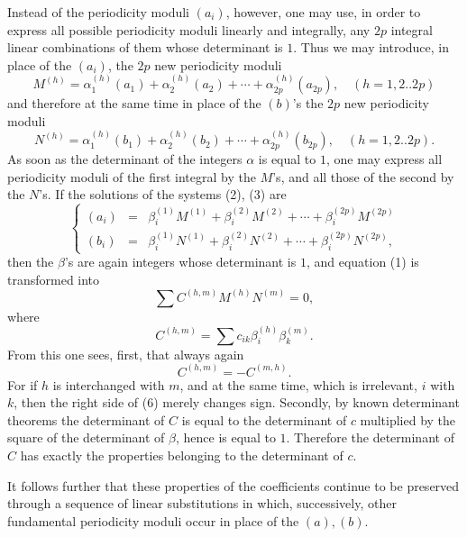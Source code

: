 \documentclass[10pt]{article}
\begin{document}
Instead of the periodicity moduli \((a_i)\), however, one may use, in order to express all possible periodicity moduli linearly and integrally, any \(2p\) integral linear combinations of them whose determinant is \(1\). Thus we may introduce, in place of the \((a_i)\), the \(2p\) new periodicity moduli
\[
\tag{2}M^{(h)}=\alpha_1^{(h)}(a_1)+\alpha_2^{(h)}(a_2)+\cdots+\alpha_{2p}^{(h)}(a_{2p}),\quad(h=1,2..2p)
\]
and therefore at the same time in place of the \((b)\)'s the \(2p\) new periodicity moduli
\[
\tag{3}N^{(h)}=\alpha_1^{(h)}(b_1)+\alpha_2^{(h)}(b_2)+\cdots+\alpha_{2p}^{(h)}(b_{2p}),\quad(h=1,2..2p).
\]
As soon as the determinant of the integers \(\alpha\) is equal to \(1\), one may express all periodicity moduli of the first integral by the \(M\)'s, and all those of the second by the \(N\)'s. If the solutions of the systems (2), (3) are
\[
\tag{4}
\left\{\begin{array}{rcl}
(a_i)&=&\beta_i^{(1)}M^{(1)}+\beta_i^{(2)}M^{(2)}+\cdots+\beta_i^{(2p)}M^{(2p)}\\
(b_i)&=&\beta_i^{(1)}N^{(1)}+\beta_i^{(2)}N^{(2)}+\cdots+\beta_i^{(2p)}N^{(2p)},
\end{array}\right.
\]
then the \(\beta\)'s are again integers whose determinant is \(1\), and equation (1) is transformed into
\[
\tag{5}\sum C^{(h,m)}M^{(h)}N^{(m)}=0,
\]
where
\[
\tag{6}C^{(h,m)}=\sum c_{ik}\beta_i^{(h)}\beta_k^{(m)}.
\]
From this one sees, first, that always again
\[
C^{(h,m)}=-C^{(m,h)}.
\]
For if \(h\) is interchanged with \(m\), and at the same time, which is irrelevant, \(i\) with \(k\), then the right side of (6) merely changes sign. Secondly, by known determinant theorems the determinant of \(C\) is equal to the determinant of \(c\) multiplied by the square of the determinant of \(\beta\), hence is equal to \(1\). Therefore the determinant of \(C\) has exactly the properties belonging to the determinant of \(c\).

It follows further that these properties of the coefficients continue to be preserved through a sequence of linear substitutions in which, successively, other fundamental periodicity moduli occur in place of the \((a),(b)\).
\end{document}
